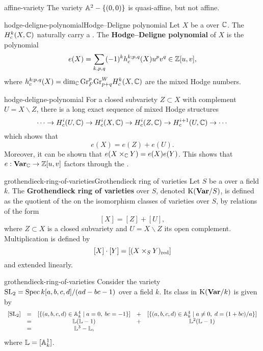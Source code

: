 \begin{example}{affine-variety}
    The variety $\AA^2 - \{ (0, 0) \}$ is quasi-affine, but not affine.
\end{example}

\begin{topic}{hodge-deligne-polynomial}{Hodge--Deligne polynomial}
    Let $X$ be a  over $\CC$. The  $H_c^k(X, \CC)$ naturally carry a . The \textbf{Hodge--Deligne polynomial} of $X$ is the polynomial
    \[ e(X) = \sum_{k, p, q} (-1)^k h_c^{k; p, q}(X) u^p v^q \in \ZZ[u, v] , \]
    where $h_c^{k; p, q}(X) = \dim_\CC \textup{Gr}_F^p \textup{Gr}^W_{p + q} H_c^k(X, \CC)$ are the mixed Hodge numbers.
\end{topic}

\begin{example}{hodge-deligne-polynomial}
    For a closed subvariety $Z \subset X$ with complement $U = X \backslash Z$, there is a long exact sequence of mixed Hodge structures
    \[ \cdots \to H_c^i(U, \CC) \to H_c^i(X, \CC) \to H_c^i(Z, \CC) \to H_c^{i + 1}(U, \CC) \to \cdots \]
    which shows that
    \[ e(X) = e(Z) + e(U) . \]
    Moreover, it can be shown that $e(X \times_\CC Y) = e(X) e(Y)$. This shows that $e : \textbf{Var}_\CC \to \ZZ[u, v]$ factors through the .
\end{example}

\begin{topic}{grothendieck-ring-of-varieties}{Grothendieck ring of varieties}
    Let $S$ be a  over a field $k$. The \textbf{Grothendieck ring of varieties} over $S$, denoted $\textup{K}(\textbf{Var}/S)$, is defined as the quotient of the  on the isomorphism classes of varieties over $S$, by relations of the form
    \[ [X] = [Z] + [U] , \]
    where $Z \subset X$ is a closed subvariety and $U = X \backslash Z$ its open complement. Multiplication is defined by
    \[ [X] \cdot [Y] = [(X \times_S Y)_\textup{red}] \]
    and extended linearly.
\end{topic}

\begin{example}{grothendieck-ring-of-varieties}
    Consider the variety $\textup{SL}_2 = \Spec k[a, b, c, d] / (ad - bc - 1)$ over a field $k$. Its class in $\textup{K}(\textbf{Var}/k)$ is given by
    \[ \begin{array}{ccccc}
        [\textup{SL}_2] & = & [\{ (a, b, c, d) \in \AA^4_k \;|\; a = 0, \; bc = -1 \}] & + & [\{ (a, b, c, d) \in \AA^4_k \;|\; a \ne 0, \; d = (1 + bc) / a \}] \\
            & = & \mathbb{L} (\mathbb{L} - 1) & + & \mathbb{L}^2 (\mathbb{L} - 1) \\
            & = & \mathbb{L}^3 - \mathbb{L} , &
    \end{array} \]
    where $\mathbb{L} = [\AA^1_k]$.
\end{example}

